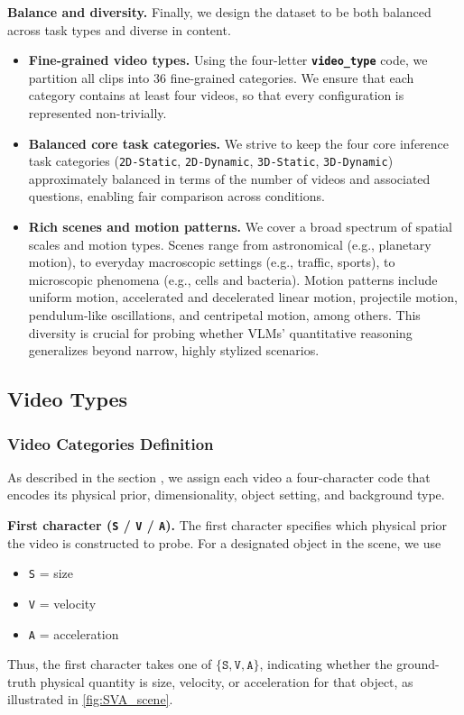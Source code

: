 \noindent\textbf{Balance and diversity.}
Finally, we design the dataset to be both balanced across task types and diverse in content.
\begin{itemize}[leftmargin=*]
  \item \textbf{Fine-grained video types.}
  Using the four-letter \textbf{\texttt{video\_type}} code, we partition all clips into 36 fine-grained categories.
  We ensure that each category contains at least four videos, so that every configuration is represented non-trivially.
  \item \textbf{Balanced core task categories.}
  We strive to keep the four core inference task categories (\texttt{2D-Static}, \texttt{2D-Dynamic}, \texttt{3D-Static}, \texttt{3D-Dynamic}) approximately balanced in terms of the number of videos and associated questions, enabling fair comparison across conditions.
  \item \textbf{Rich scenes and motion patterns.}
  We cover a broad spectrum of spatial scales and motion types.
  Scenes range from astronomical (e.g., planetary motion), to everyday macroscopic settings (e.g., traffic, sports), to microscopic phenomena (e.g., cells and bacteria).
  Motion patterns include uniform motion, accelerated and decelerated linear motion, projectile motion, pendulum-like oscillations, and centripetal motion, among others.
  This diversity is crucial for probing whether VLMs’ quantitative reasoning generalizes beyond narrow, highly stylized scenarios.
\end{itemize}

\subsection{Video Types}
\label{subsec:video_type}
\subsubsection{Video Categories Definition}
As described in the section , we assign each video a four-character code that encodes its physical prior, dimensionality, object setting, and background type.

\noindent\textbf{First character (\texttt{S} / \texttt{V} / \texttt{A}).}
The first character specifies which physical prior the video is constructed to probe. For a designated object in the scene, we use
\begin{itemize}[leftmargin=1.6em,topsep=0.2em,itemsep=0pt]
  \item \texttt{S} = size
  \item \texttt{V} = velocity
  \item \texttt{A} = acceleration
\end{itemize}
Thus, the first character takes one of $\{\texttt{S}, \texttt{V}, \texttt{A}\}$, indicating whether the ground-truth physical quantity is size, velocity, or acceleration for that object, as illustrated in \autoref{fig:SVA_scene}.

